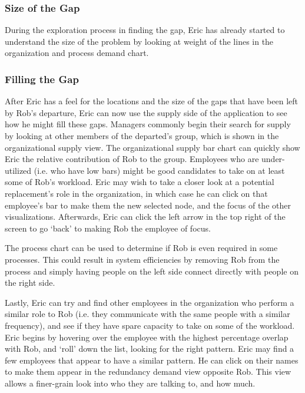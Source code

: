 \documentclass[journal]{vgtc}                %
\begin{document}
\subsubsection{Size of the Gap}
During the exploration process in finding the gap, Eric has already started to understand the size of the problem by looking at weight of the lines in the organization and process demand chart.

\subsubsection{Filling the Gap}
After Eric has a feel for the locations and the size of the gaps that have been left by Rob's departure, Eric can now use the supply side of the application to see how he might fill these gaps. Managers commonly begin their search for supply by looking at other members of the departed's group, which is shown in the organizational supply view. The organizational supply bar chart can quickly show Eric the relative contribution of Rob to the group. Employees who are under-utilized (i.e. who have low bars) might be good candidates to take on at least some of Rob's workload. Eric may wish to take a closer look at a potential replacement's role in the organization, in which case he can click on that employee's bar to make them the new selected node, and the focus of the other visualizations. Afterwards, Eric can click the left arrow in the top right of the screen to go \lq back\rq{} to making Rob the employee of focus.

The process chart can be used to determine if Rob is even required in some processes.  This could result in system efficiencies by removing Rob from the process and simply having people on the left side connect directly with people on the right side.

Lastly, Eric can try and find other employees in the organization who perform a similar role to Rob (i.e. they communicate with the same people with a similar frequency), and see if they have spare capacity to take on some of the workload.  Eric begins by hovering over the employee with the highest percentage overlap with Rob, and \lq roll\rq{} down the list, looking for the right pattern. Eric may find a few employees that appear to have a similar pattern. He can click on their names to make them appear in the redundancy demand view opposite Rob. This view allows a finer-grain look into who they are talking to, and how much.
\end{document}

